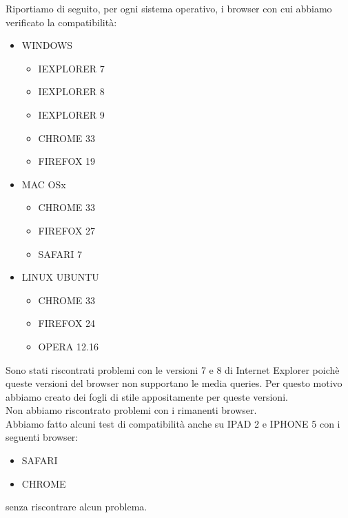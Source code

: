 Riportiamo di seguito, per ogni sistema operativo, i browser con cui abbiamo verificato la compatibilit\`a:
\begin{itemize}
		\item WINDOWS
		\begin{itemize}
			\item IEXPLORER 7
			\item IEXPLORER 8
			\item IEXPLORER 9
			\item CHROME 33
			\item FIREFOX 19
		\end{itemize}
		\item MAC OSx
		\begin{itemize}
			\item CHROME 33
			\item FIREFOX 27
			\item SAFARI 7
		\end{itemize}
		\item LINUX UBUNTU
		\begin{itemize}
			\item CHROME 33
			\item FIREFOX 24
			\item OPERA 12.16
		\end{itemize}
\end{itemize}

Sono stati riscontrati problemi con le versioni 7 e 8 di Internet Explorer poich\`e queste versioni del browser non supportano le media queries. Per questo motivo abbiamo creato dei fogli di stile appositamente per queste versioni.
\\Non abbiamo riscontrato problemi con i rimanenti browser.
\\Abbiamo fatto alcuni test di compatibilit\`a anche su IPAD 2 e IPHONE 5 con i seguenti browser:
\begin{itemize}
	\item SAFARI
	\item CHROME
\end{itemize}
senza riscontrare alcun problema.